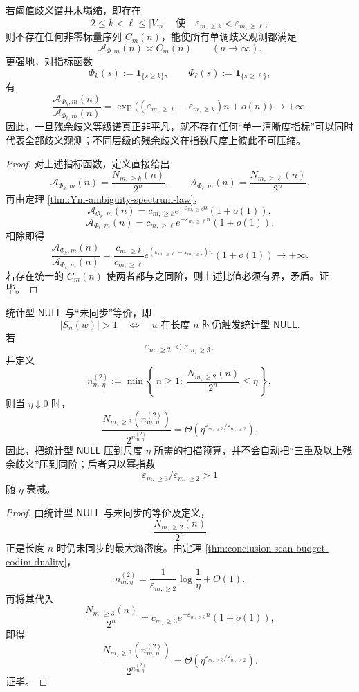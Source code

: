 \begin{theorem}[清晰度的不可单标量化定理]\label{thm:conclusion-clarity-nonscalarization}
若阈值歧义谱并未塌缩，即存在
\[
2\le k<\ell\le |V_m|
\quad\text{使}\quad
\varepsilon_{m,\ge k}<\varepsilon_{m,\ge \ell},
\]
则不存在任何非零标量序列 \(C_m(n)\)，能使所有单调歧义观测都满足
\[
\mathcal A_{\Phi,m}(n)\asymp C_m(n)\qquad (n\to\infty).
\]
更强地，对指标函数
\[
\Phi_k(s):=\mathbf 1_{\{s\ge k\}},
\qquad
\Phi_\ell(s):=\mathbf 1_{\{s\ge \ell\}},
\]
有
\[
\frac{\mathcal A_{\Phi_k,m}(n)}{\mathcal A_{\Phi_\ell,m}(n)}
=
\exp\!\bigl((\varepsilon_{m,\ge \ell}-\varepsilon_{m,\ge k})n+o(n)\bigr)
\longrightarrow +\infty.
\]
因此，一旦残余歧义等级谱真正非平凡，就不存在任何“单一清晰度指标”可以同时代表全部歧义观测；不同层级的残余歧义在指数尺度上彼此不可压缩。
\end{theorem}
\begin{proof}
对上述指标函数，定义直接给出
\[
\mathcal A_{\Phi_k,m}(n)=\frac{N_{m,\ge k}(n)}{2^n},
\qquad
\mathcal A_{\Phi_\ell,m}(n)=\frac{N_{m,\ge \ell}(n)}{2^n}.
\]
再由定理 \ref{thm:Ym-ambiguity-spectrum-law}，
\[
\mathcal A_{\Phi_k,m}(n)
=
c_{m,\ge k}e^{-\varepsilon_{m,\ge k}n}(1+o(1)),
\]
\[
\mathcal A_{\Phi_\ell,m}(n)
=
c_{m,\ge \ell}e^{-\varepsilon_{m,\ge \ell}n}(1+o(1)).
\]
相除即得
\[
\frac{\mathcal A_{\Phi_k,m}(n)}{\mathcal A_{\Phi_\ell,m}(n)}
=
\frac{c_{m,\ge k}}{c_{m,\ge \ell}}
e^{(\varepsilon_{m,\ge \ell}-\varepsilon_{m,\ge k})n}(1+o(1))
\to +\infty.
\]
若存在统一的 \(C_m(n)\) 使两者都与之同阶，则上述比值必须有界，矛盾。证毕。
\end{proof}

\begin{corollary}\label{cor:conclusion-statnull-vs-deep-ambiguity-scale-separation}
统计型 \(\mathsf{NULL}\) 与“未同步”等价，即
\[
|S_n(w)|>1
\quad\Longleftrightarrow\quad
w\ \text{在长度 }n\text{ 时仍触发统计型 }\mathsf{NULL}.
\]
若
\[
\varepsilon_{m,\ge 2}<\varepsilon_{m,\ge 3},
\]
并定义
\[
n_{m,\eta}^{(2)}
:=
\min\left\{\,n\ge 1:\ \frac{N_{m,\ge 2}(n)}{2^n}\le \eta\,\right\},
\]
则当 \(\eta\downarrow 0\) 时，
\[
\frac{N_{m,\ge 3}(n_{m,\eta}^{(2)})}{2^{n_{m,\eta}^{(2)}}}
=
\Theta\!\left(\eta^{\varepsilon_{m,\ge 3}/\varepsilon_{m,\ge 2}}\right).
\]
因此，把统计型 \(\mathsf{NULL}\) 压到尺度 \(\eta\) 所需的扫描预算，并不会自动把“三重及以上残余歧义”压到同阶；后者只以幂指数
\[
\varepsilon_{m,\ge 3}/\varepsilon_{m,\ge 2}>1
\]
随 \(\eta\) 衰减。
\end{corollary}
\begin{proof}
由统计型 \(\mathsf{NULL}\) 与未同步的等价及定义，
\[
\frac{N_{m,\ge 2}(n)}{2^n}
\]
正是长度 \(n\) 时仍未同步的最大熵密度。由定理 \ref{thm:conclusion-scan-budget-codim-duality}，
\[
n_{m,\eta}^{(2)}
=
\frac{1}{\varepsilon_{m,\ge 2}}\log\frac1\eta+O(1).
\]
再将其代入
\[
\frac{N_{m,\ge 3}(n)}{2^n}
=
c_{m,\ge 3}e^{-\varepsilon_{m,\ge 3}n}(1+o(1)),
\]
即得
\[
\frac{N_{m,\ge 3}(n_{m,\eta}^{(2)})}{2^{n_{m,\eta}^{(2)}}}
=
\Theta\!\left(\eta^{\varepsilon_{m,\ge 3}/\varepsilon_{m,\ge 2}}\right).
\]
证毕。
\end{proof}

